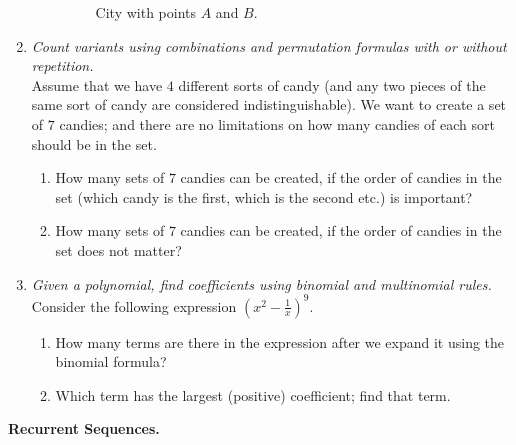 \documentclass[a4paper,12pt]{article}
\begin{document}
\begin{enumerate}
\begin{enumerate}
\begin{figure}[!htb]
\caption{\label{fig:part3-square-city}  City with points $A$ and $B$.}
\end{figure}

\begin{center}

\end{center}
\end{enumerate}


\item {\small \em Count variants using combinations and permutation formulas with or without repetition.}\\
Assume that we have $4$ different sorts of candy (and any two pieces of the same sort of candy are considered indistinguishable).
We want to create a set of $7$ candies; and there are no limitations on how many candies of each sort should be in the set.
\begin{enumerate}
\item How many sets of $7$ candies can be created, if the order of candies in the set (which candy is the first, which
is the second etc.) is important?
\item How many sets of $7$ candies can be created, if the order of candies in the set does not matter?
\end{enumerate}


\item {\small \em Given a polynomial, find coefficients using binomial and multinomial rules.}\\
Consider the following expression ${\displaystyle \left(x^2 - \frac{1}{x}\right)^{9}}$.
\begin{enumerate}
\item
How many terms are there in the expression  after we expand it using the binomial formula?
\item
Which term has the largest (positive) coefficient; find that term.
\end{enumerate}
\end{enumerate}





\vspace{10pt}
{\bf Recurrent Sequences.}
\end{document}
